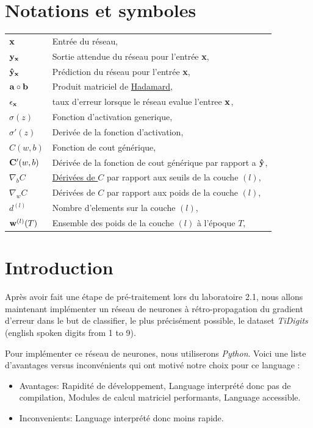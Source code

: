 \documentclass[11pt]{article}
\begin{document}
\EtsPageGenerate
\tableofcontents

\newpage
\section{Notations et symboles}
\begin{tabular}{p{1.75cm}p{10cm}}
	${\bf x}$ & Entr\'ee du r\'eseau, \\
	${\bf y_x}$ & Sortie attendue du r\'eseau pour l'entr\'ee {\bf x}, \\
	${\bf \hat y_x}$ & Pr\'ediction du r\'eseau pour l'entr\'ee {\bf x}, \\
	${\bf a} \circ {\bf b}$ & Produit matriciel de
		\href{https://en.wikipedia.org/wiki/Hadamard_product_(matrices)}
		{Hadamard}, \\
	$\epsilon_{\bf x}$ & taux d'erreur lorsque le r\'eseau evalue l'entree ${\bf x}$, \\
	$\sigma(z)$ & Fonction d'activation generique, \\
	$\sigma'(z)$ & Deriv\'ee de la fonction d'activation, \\
	$C(w, b)$ & Fonction de cout g\'en\'erique, \\
	${\bf C}'(w, b)$ & D\'eriv\'ee de la fonction de cout g\'en\'erique par
		rapport a ${\bf \hat y}$, \\
	$\nabla_bC$ & \href{https://en.wikipedia.org/wiki/Matrix_calculus}
		{D\'eriv\'ees de $C$} par rapport aux seuils de la couche $(l)$, \\
	$\nabla_wC$ & D\'eriv\'ees de $C$ par rapport aux poids de la couche $(l)$, \\
	$d^{(l)}$ & Nombre d'elements sur la couche $(l)$, \\
	${\bf w}^{(l)}(T)$ & Ensemble des poids de la couche $(l)$ \`a l'\'epoque $T$, \\
\end{tabular}
\newpage



\section{Introduction}
Après avoir fait une étape de pré-traitement lors du laboratoire 2.1, nous
allons maintenant implémenter un r\'eseau de neurones \`a r\'etro-propagation du
gradient d’erreur dans le but de classifier, le plus précisément possible,
le dataset {\em TiDigits} (english spoken digits from 1 to 9).

Pour implémenter ce r\'eseau de neurones, nous utiliserons {\em Python}.
Voici une liste d'avantages versus inconv\'enients qui ont motiv\'e notre choix
pour ce language :
\begin{itemize}
	\item Avantages:
		\subitem Rapidit\'e de d\'eveloppement,
		\subitem Language interpr\'et\'e donc pas de compilation,
		\subitem Modules de calcul matriciel performants,
		\subitem Language accessible.
	\item Inconvenients:
		\subitem Language interpr\'et\'e donc moins rapide. \\
\end{itemize}
\end{document}
